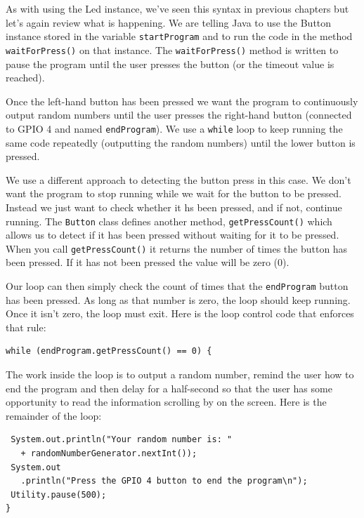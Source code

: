 As with using the Led instance, we've seen this syntax in previous chapters but let's again review what is happening. We are telling Java to use the Button instance stored in the variable \texttt{startProgram} and to run the code in the method \texttt{waitForPress()} on that instance. The \texttt{waitForPress()} method is written to pause the program until the user presses the button (or the timeout value is reached).

Once the left-hand button has been pressed we want the program to continuously output random numbers until the user presses the right-hand button (connected to GPIO 4 and named \texttt{endProgram}). We use a \texttt{while} loop to keep running the same code repeatedly (outputting the random numbers) until the lower button is pressed. 

We use a different approach to detecting the button press in this case. We don't want the program to stop running while we wait for the button to be pressed. Instead we just want to check whether it hs been pressed, and if not, continue running. The \texttt{Button} class defines another method, \texttt{getPressCount()} which allows us to detect if it has been pressed without waiting for it to be pressed. When you call \texttt{getPressCount()} it returns the number of times the button has been pressed. If it has not been pressed the value will be zero (0).

Our loop can then simply check the count of times that the \texttt{endProgram} button has been pressed. As long as that number is zero, the loop should keep running. Once it isn't zero, the loop must exit. Here is the loop control code that enforces that rule:

\beforeverb
\begin{verbatim}
while (endProgram.getPressCount() == 0) {
\end{verbatim}
\afterverb

The work inside the loop is to output a random number, remind the user how to end the program and then delay for a half-second so that the user has some opportunity to read the information scrolling by on the screen. Here is the remainder of the loop:

\beforeverb
\begin{verbatim}
 System.out.println("Your random number is: "
   + randomNumberGenerator.nextInt());
 System.out
   .println("Press the GPIO 4 button to end the program\n");
 Utility.pause(500);
}
\end{verbatim}
\afterverb

